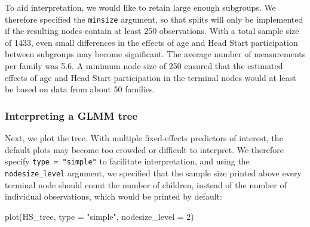 \documentclass[doc,floatsintext,natbib]{apa7}
\begin{document}

To aid interpretation, we would like to retain large enough subgroups. We therefore specified the \texttt{minsize} argument, so that splits will only be implemented if the resulting nodes contain at least 250 observations. With a total sample size of 1433, even small differences in the effects of age and Head Start participation between subgroups may become significant. The average number of measurements per family was 5.6. A minimum node size of 250 ensured that the estimated effects of age and Head Start participation in the terminal nodes would at least be based on data from about 50 families.


\subsubsection{Interpreting a GLMM tree}

Next, we plot the tree. With multiple fixed-effects predictors of interest, the default plots may become too crowded or difficult to interpret. We therefore specify \verb|type = "simple"| to facilitate interpretation, and using the \verb|nodesize_level| argument, we specified that the sample size printed above every terminal node should count the number of children, instead of the number of individual observations, which would be printed by default:

\begin{Schunk}
\begin{Sinput}
 plot(HS_tree, type = "simple", nodesize_level = 2)
\end{Sinput}
\end{Schunk}
\end{document}
